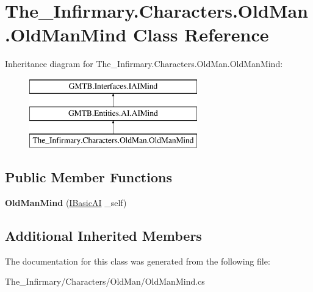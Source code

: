 \hypertarget{class_the___infirmary_1_1_characters_1_1_old_man_1_1_old_man_mind}{}\section{The\+\_\+\+Infirmary.\+Characters.\+Old\+Man.\+Old\+Man\+Mind Class Reference}
\label{class_the___infirmary_1_1_characters_1_1_old_man_1_1_old_man_mind}
Inheritance diagram for The\+\_\+\+Infirmary.\+Characters.\+Old\+Man.\+Old\+Man\+Mind\+:\begin{figure}[H]
\begin{center}
\leavevmode
\includegraphics[height=3.000000cm]{class_the___infirmary_1_1_characters_1_1_old_man_1_1_old_man_mind}
\end{center}
\end{figure}
\subsection*{Public Member Functions}
\begin{DoxyCompactItemize}
\item 
\mbox{\label{class_the___infirmary_1_1_characters_1_1_old_man_1_1_old_man_mind_adeca90062c2acb303c2e71fd6d6de840}} 
{\bfseries Old\+Man\+Mind} (\mbox{\hyperlink{interface_g_m_t_b_1_1_interfaces_1_1_i_basic_a_i}{I\+Basic\+AI}} \+\_\+self)
\end{DoxyCompactItemize}
\subsection*{Additional Inherited Members}


The documentation for this class was generated from the following file\+:\begin{DoxyCompactItemize}
\item 
The\+\_\+\+Infirmary/\+Characters/\+Old\+Man/Old\+Man\+Mind.\+cs\end{DoxyCompactItemize}
